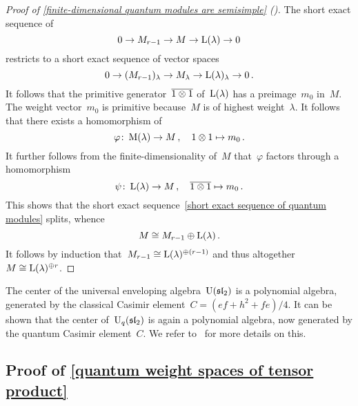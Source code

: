 \documentclass[a4paper, 11pt, oneside]{scrartcl}
\begin{document}
\begin{proof}[Proof of \cref{finite-dimensional quantum modules are semisimple} ({\cite[Theorem~2.9]{jantzen_quantum}})]
  The short exact sequence of~
  \begin{equation}
    \label{short exact sequence of quantum modules}
    0
    \to
    M_{r-1}
    \to
    M
    \to
    \operatorname{L}(\lambda)
    \to
    0
  \end{equation}
  restricts to a short exact sequence of vector spaces
  \[
    0
    \to
    ( M_{r-1} )_\lambda
    \to
    M_\lambda
    \to
    \operatorname{L}(\lambda)_\lambda
    \to
    0 \,.
  \]
  It follows that the primitive generator~$\overline{1 \otimes 1}$ of~$\operatorname{L}(\lambda)$ has a preimage~$m_0$ in~$M$.
  The weight vector~$m_0$ is primitive because~$M$ is of highest weight~$\lambda$.
  It follows that there exists a homomorphism of~
  \[
    \varphi
    \colon
    \operatorname{M}(\lambda)
    \to
    M
    \,,
    \quad
    1 \otimes 1
    \mapsto
    m_0 \,.
  \]
  It further follows from the finite-dimensionality of~$M$ that~$\varphi$ factors through a homomorphism
  \[
    \psi
    \colon
    \operatorname{L}(\lambda)
    \to
    M
    \,,
    \quad
    \overline{1 \otimes 1}
    \mapsto
    m_0 \,.
  \]
  This shows that the short exact sequence~\eqref{short exact sequence of quantum modules} splits, whence
  \[
    M \cong M_{r-1} \oplus \operatorname{L}(\lambda) \,.
  \]
  It follows by induction that~$M_{r-1} \cong \operatorname{L}(\lambda)^{\oplus (r-1)}$ and thus altogether~$M \cong \operatorname{L}(\lambda)^{\oplus r}$.
\end{proof}

\begin{remark}
  The center of the universal enveloping algebra~$\operatorname{U}(\mathfrak{sl}_2)$ is a polynomial algebra, generated by the classical Casimir element~$C = (ef + h^2 + fe)/4$.
  It can be shown that the center of~$\operatorname{U}_q(\mathfrak{sl}_2)$ is again a polynomial algebra, now generated by the quantum Casimir element~$C$.
  We refer to~\cite[Proposition~2.18]{jantzen_quantum} for more details on this.
\end{remark}



\subsection{Proof of \cref{quantum weight spaces of tensor product}}
\label{proof of quantum weight spaces of tensor product}
\end{document}
